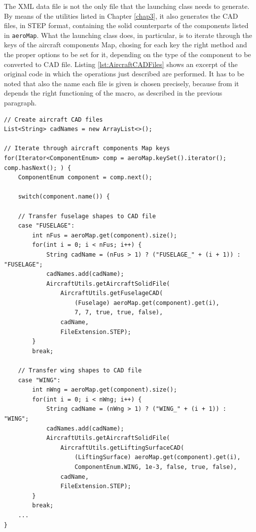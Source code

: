\bigskip
\noindent
The XML data file is not the only file that the launching class needs to generate. By means of the utilities listed in Chapter \ref{chap3}, it also generates the \gls{CAD} files, in STEP format, containing the solid counterparts of the components listed in \lstinline[language=Java]!aeroMap!. What the launching class does, in particular, is to iterate through the keys of the aircraft components \gls{Map}, chosing for each key the right method and the proper options to be set for it, depending on the type of the component to be converted to \gls{CAD} file. Listing \ref{lst:AircraftCADFiles} shows an excerpt of the original code in which the operations just described are performed. It has to be noted that also the name each file is given is chosen precisely, because from it depends the right functioning of the macro, as described in the previous paragraph.
%
\bigskip
\begin{lstlisting}[caption={Aircraft components CAD files generation}, captionpos=b, tabsize=2, label={lst:AircraftCADFiles}]
// Create aircraft CAD files
List<String> cadNames = new ArrayList<>();
		
// Iterate through aircraft components Map keys
for(Iterator<ComponentEnum> comp = aeroMap.keySet().iterator(); comp.hasNext(); ) {
	ComponentEnum component = comp.next();
			
	switch(component.name()) {
	
	// Transfer fuselage shapes to CAD file		
	case "FUSELAGE":
		int nFus = aeroMap.get(component).size();				 
		for(int i = 0; i < nFus; i++) {
			String cadName = (nFus > 1) ? ("FUSELAGE_" + (i + 1)) : "FUSELAGE";
			cadNames.add(cadName);
			AircraftUtils.getAircraftSolidFile(
				AircraftUtils.getFuselageCAD(
					(Fuselage) aeroMap.get(component).get(i), 
					7, 7, true, true, false), 
				cadName, 
				FileExtension.STEP);
		}
		break;
	
	// Transfer wing shapes to CAD file			
	case "WING":
		int nWng = aeroMap.get(component).size();				 
		for(int i = 0; i < nWng; i++) {
			String cadName = (nWng > 1) ? ("WING_" + (i + 1)) : "WING";
			cadNames.add(cadName);
			AircraftUtils.getAircraftSolidFile(
				AircraftUtils.getLiftingSurfaceCAD(
					(LiftingSurface) aeroMap.get(component).get(i), 
					ComponentEnum.WING, 1e-3, false, true, false), 
				cadName, 
				FileExtension.STEP);
		}
		break;				
	...
}
\end{lstlisting}
%

